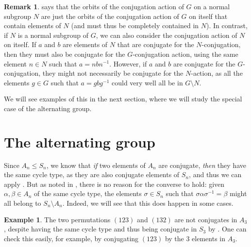 \documentclass[12pt]{report}
\numberwithin{equation}{section}
\numberwithin{theorem}{chapter}
\theoremstyle{definition}
\newtheorem{example}[theorem]{Example}
\newtheorem*{basic properties}{Basic Properties}
\newtheorem*{Important Remark}{Important Remark}
\newtheorem{remark}[theorem]{Remark}
\begin{document}
\begin{remark}\label{remark conjugation descending}	
 says that the orbits of the conjugation action of $G$ on a normal subgroup $N$ are just the orbits of the conjugation action of $G$ on itself that contain elements of $N$ (and must thus be completely contained in $N$). In contrast, if $N$ is a normal subgroup of $G$, we can also consider the conjugation action of $N$ on itself. If $a$ and $b$ are elements of $N$ that are conjugate for the $N$-conjugation, then they must also be conjugate for the $G$-conjugation action, using the same element $n \in N$ such that $a =nbn^{-1}$. However, if $a$ and $b$ are conjugate for the $G$-conjugation, they might not necessarily be conjugate for the $N$-action, as all the elements $g \in G$ such that $a = gbg^{-1}$ could very well all be in $G \setminus N$.
\end{remark}

We will see examples of this in the next section, where we will study the special case of the alternating group.

%

\newpage

\section{The alternating group}


Since $A_n \leq S_n$, we know that {\em if} two elements of $A_n$ are conjugate, {\em then} they have the same cycle type, as they are also conjugate elements of $S_n$, and thus we can apply . But as noted in , there is no reason for the converse to hold: given $\alpha, \beta \in A_n$ of the same cycle type, the elements $\sigma \in S_n$ such that $\sigma \alpha \sigma^{-1} = \beta$ might all belong to $S_n \setminus A_n$. Indeed, we will see that this does happen in some cases.


\begin{example}
The two permutations $(123)$ and $(132)$ are not conjugates in $A_3$, despite having the same cycle type and thus being conjugate in $S_3$ by . One can check this easily, for example, by conjugating $(123)$ by the $3$ elements in $A_3$.
\end{example}
\end{document}
